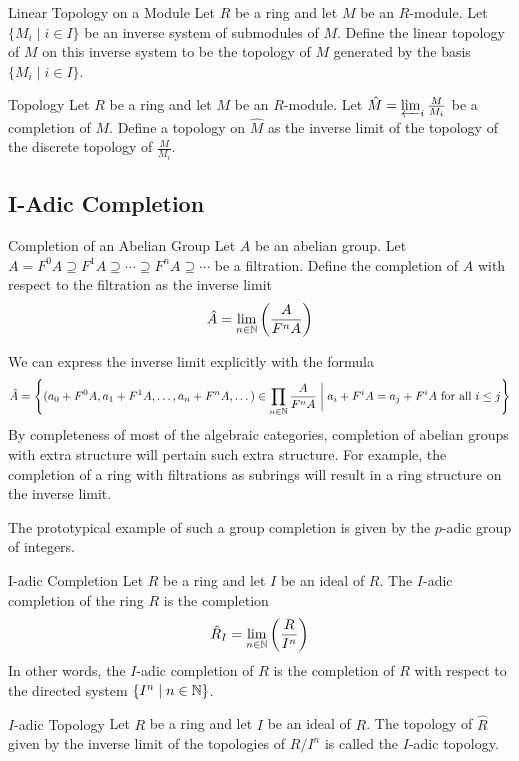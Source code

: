 \documentclass[a4paper]{article}
\begin{document}
\begin{defn}{Linear Topology on a Module}{} Let $R$ be a ring and let $M$ be an $R$-module. Let $\{M_i\;|\; i\in I\}$ be an inverse system of submodules of $M$. Define the linear topology of $M$ on this inverse system to be the topology of $M$ generated by the basis $\{M_i\;|\; i\in I\}$. 
\end{defn}

\begin{defn}{Topology}{} Let $R$ be a ring and let $M$ be an $R$-module. Let $\hat{M}=\varprojlim_i\frac{M}{M_i}$ be a completion of $M$. Define a topology on $\hat{M}$ as the inverse limit of the topology of the discrete topology of $\frac{M}{M_i}$. 
\end{defn}

\subsection{I-Adic Completion}
\begin{defn}{Completion of an Abelian Group}{} Let $A$ be an abelian group. Let $A=F^0A\supseteq F^1A\supseteq\cdots\supseteq F^nA\supseteq\cdots$ be a filtration. Define the completion of $A$ with respect to the filtration as the inverse limit $$\hat{A}=\lim_{n\in\mathbb{N}}\left(\frac{A}{F^nA}\right)$$
\end{defn}

We can express the inverse limit explicitly with the formula $$\hat{A}=\left\{(a_0+F^0A,a_1+F^1A,\dots,a_n+F^nA,\dots)\in\prod_{n\in\mathbb{N}}\frac{A}{F^nA}\;\bigg{|}\;a_i+F^iA=a_j+F^iA\text{ for all }i\leq j\right\}$$ By completeness of most of the algebraic categories, completion of abelian groups with extra structure will pertain such extra structure. For example, the completion of a ring with filtrations as subrings will result in a ring structure on the inverse limit. 

The prototypical example of such a group completion is given by the $p$-adic group of integers. 

\begin{defn}{I-adic Completion}{} Let $R$ be a ring and let $I$ be an ideal of $R$. The $I$-adic completion of the ring $R$ is the completion $$\hat{R}_I=\lim_{n\in\mathbb{N}}\left(\frac{R}{I^n}\right)$$ In other words, the $I$-adic completion of $R$ is the completion of $R$ with respect to the directed system $\{I^n\;|\;n\in\mathbb{N}\}$. 
\end{defn}

\begin{defn}{$I$-adic Topology}{} Let $R$ be a ring and let $I$ be an ideal of $R$. The topology of $\hat{R}$ given by the inverse limit of the topologies of $R/I^n$ is called the $I$-adic topology. 
\end{defn}
\end{document}
